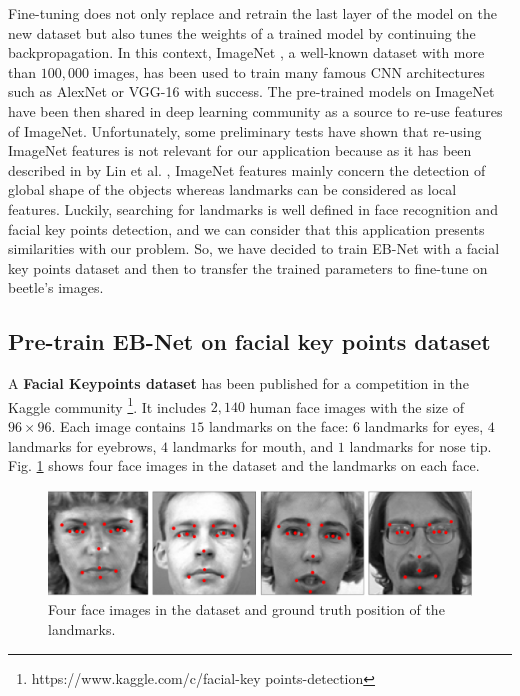 \documentclass[review]{elsarticle}
\begin{document}
Fine-tuning does not only replace and retrain the last layer of the model on
the new dataset but also tunes the weights of a trained model by
continuing the backpropagation. In this context, ImageNet
\cite{imagenet_cvpr09}, a well-known dataset with more than $100,000 $
images, has been used to train many famous CNN architectures such as
AlexNet \cite{krizhevsky2012imagenet} or VGG-16
\cite{simonyan2014very} with success. The pre-trained models on
ImageNet have been then shared in deep learning community as a source
to re-use features of ImageNet. Unfortunately, some preliminary tests
have shown that re-using ImageNet features is not relevant for our
application because as it has been described in by Lin et
al. \cite{lin2016homemade}, ImageNet features mainly concern the
detection of global shape of the objects whereas landmarks can be
considered as local features. Luckily, searching for landmarks is
well defined in face recognition and facial key points detection, and 
we can consider that this application presents similarities with our problem. So,
we have decided to train EB-Net with a facial key points dataset and
then to transfer the trained parameters to fine-tune on beetle's
images.

\subsection{Pre-train EB-Net on facial key points dataset}
A \textbf{Facial Keypoints dataset} has been published for a
competition in the  Kaggle
community \footnote{https://www.kaggle.com/c/facial-key
  points-detection}. It includes $2,140$ human face images with the
size of $96 \times 96$. Each image contains $15$ landmarks on the
face: $6$ landmarks for eyes, $4$ landmarks for eyebrows, $4$
landmarks for mouth, and $1$ landmarks for nose
tip. Fig. \ref{figaface} shows four face images in the dataset and the
landmarks on each face.

\begin{figure}[htbp]
	\centerline{\includegraphics[scale=0.16]{images/face_dataset_2.png}}
	\caption{Four face images in the dataset and ground truth position of the landmarks.}
	\label{figaface}
\end{figure}
\end{document}

